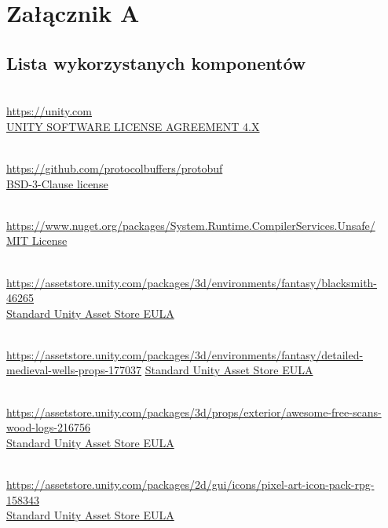 \chapter*{Załącznik A}
\section*{Lista wykorzystanych komponentów}
\begin{description}[]

  \item[Unity] \hfill \\ \url{https://unity.com} \\
  \href{https://unity.com/legal/eula}{UNITY SOFTWARE LICENSE AGREEMENT 4.X}

  \item[Protocol Buffers] \hfill \\ \url{https://github.com/protocolbuffers/protobuf} \\
  \href{https://licenses.nuget.org/BSD-3-Clause}{BSD-3-Clause license}

\item[System.Runtime.CompilerServices.Unsafe] \hfill \\ \url{https://www.nuget.org/packages/System.Runtime.CompilerServices.Unsafe/} \\
  \href{https://licenses.nuget.org/MIT}{MIT License}

\item[Blacksmith] \hfill \\ \url{https://assetstore.unity.com/packages/3d/environments/fantasy/blacksmith-46265} \\
  \href{https://unity.com/legal/as-terms}{Standard Unity Asset Store EULA}

\item[DETAILED - Medieval Wells \& Props] \hfill \\ \url{https://assetstore.unity.com/packages/3d/environments/fantasy/detailed-medieval-wells-props-177037}
  \href{https://unity.com/legal/as-terms}{Standard Unity Asset Store EULA}

\item[Awesome Free Scans - Wood Logs] \hfill \\ \url{https://assetstore.unity.com/packages/3d/props/exterior/awesome-free-scans-wood-logs-216756} \\
  \href{https://unity.com/legal/as-terms}{Standard Unity Asset Store EULA}


\item[Pixel Art Icon Pack - RPG] \hfill \\ \url{https://assetstore.unity.com/packages/2d/gui/icons/pixel-art-icon-pack-rpg-158343} \\
  \href{https://unity.com/legal/as-terms}{Standard Unity Asset Store EULA}


\end{description}
